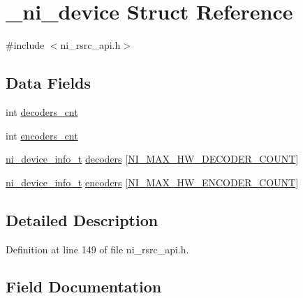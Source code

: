 \hypertarget{struct__ni__device}{}\section{\+\_\+ni\+\_\+device Struct Reference}
\label{struct__ni__device}


{\ttfamily \#include $<$ni\+\_\+rsrc\+\_\+api.\+h$>$}

\subsection*{Data Fields}
\begin{DoxyCompactItemize}
\item 
int \mbox{\hyperlink{struct__ni__device_a62bbd6ec5fb62969214055e648942489}{decoders\+\_\+cnt}}
\item 
int \mbox{\hyperlink{struct__ni__device_aec9b0224277619e9191086b0db1b11ad}{encoders\+\_\+cnt}}
\item 
\mbox{\hyperlink{ni__rsrc__api_8h_a37a9b9f89ba495d469222af27ce3058b}{ni\+\_\+device\+\_\+info\+\_\+t}} \mbox{\hyperlink{struct__ni__device_acb1c35e8cb7658e73d736af57a9b03b9}{decoders}} \mbox{[}\mbox{\hyperlink{ni__rsrc__api_8h_aa1598022fc5ef313306c50f901940946}{N\+I\+\_\+\+M\+A\+X\+\_\+\+H\+W\+\_\+\+D\+E\+C\+O\+D\+E\+R\+\_\+\+C\+O\+U\+NT}}\mbox{]}
\item 
\mbox{\hyperlink{ni__rsrc__api_8h_a37a9b9f89ba495d469222af27ce3058b}{ni\+\_\+device\+\_\+info\+\_\+t}} \mbox{\hyperlink{struct__ni__device_ab6243ce9f94426b261a2278ac07d718f}{encoders}} \mbox{[}\mbox{\hyperlink{ni__rsrc__api_8h_a41809901a12b4be816387878e15c69f3}{N\+I\+\_\+\+M\+A\+X\+\_\+\+H\+W\+\_\+\+E\+N\+C\+O\+D\+E\+R\+\_\+\+C\+O\+U\+NT}}\mbox{]}
\end{DoxyCompactItemize}


\subsection{Detailed Description}


Definition at line 149 of file ni\+\_\+rsrc\+\_\+api.\+h.



\subsection{Field Documentation}
\mbox{\label{struct__ni__device_acb1c35e8cb7658e73d736af57a9b03b9}} 
